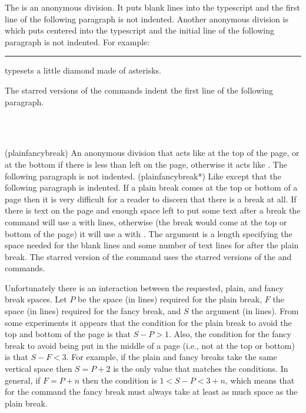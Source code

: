     The \cmd{\plainbreak} is an anonymous division. It puts 
blank lines into the typescript and the first line of the following
paragraph is not indented. Another anonymous 
division is \cmd{\fancybreak} which puts  centered into the 
typescript and the initial line of the following paragraph is not 
indented. For
example:
\begin{lcode}
\fancybreak{{*}\\{* * *}\\{*}}
\end{lcode}
typesets a little diamond made of asterisks.

    The starred versions of the commands indent the first line of the
following paragraph.

\begin{syntax}
\cmd{\plainfancybreak} \\
\cmd{\plainfancybreak*} \\
\end{syntax}
\glossary(plainfancybreak)%
  {}%
  {An anonymous division that acts like  at the top
   of the page, or at the bottom if there is less than 
   left on the page, otherwise it acts like .
   The following paragraph is not indented.}
\glossary(plainfancybreak*)%
  {}%
  {Like  except that the following paragraph is indented.}
If a plain break comes at the top or bottom of a page then it is very 
difficult for a reader to discern that there is a break at all.
If there is text on the page and enough space left to put some text
after a break the \cmd{\plainfancybreak} command will use a \cmd{\plainbreak}
with  lines, 
otherwise (the break would come at the top or bottom of the page) it
will use a \cmd{\fancybreak} with . The  argument is a
length specifying the space needed for the  blank lines and some
number of text lines for after the plain break. The starred version of
the command uses the starred versions of the \cmd{\plainbreak} and
\cmd{\fancybreak} commands.


    Unfortunately there is an interaction between the requested, plain,
and fancy break spaces.
    Let $P$ be the space (in lines) required for the plain break, 
$F$ the space (in lines)
required for the fancy break, and $S$ the  argument (in lines). 
From some experiments it appears that the condition for the plain break 
to avoid the top and bottom of the page is that $S - P > 1$. 
Also, the condition for the fancy break to avoid being put in the middle 
of a page (i.e., not at the top or bottom) is that  $S - F < 3$.
For example, if the plain and fancy breaks take the same vertical space
then $S = P +2$ is the only value that matches the conditions. In general, 
if $F = P + n$ then the condition is $1 < S-P < 3+n$, which means that 
for the \cmd{\plainfancybreak} command the
fancy break must always take at least as much space as the plain break.


